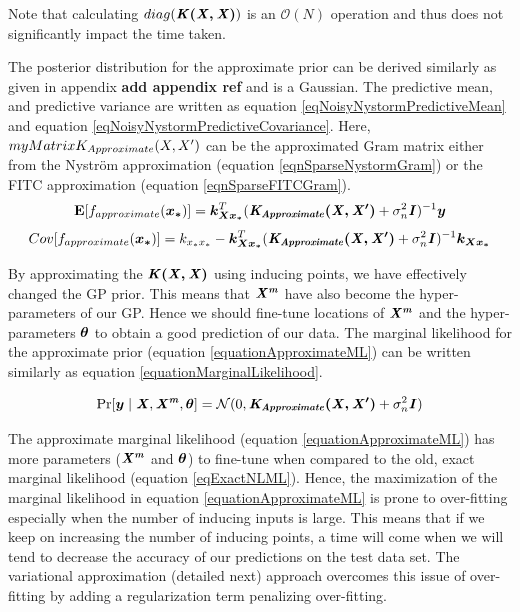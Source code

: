 Note that calculating $diag(\bm{\mathit{K(X, X)}})$ is an $\mathcal{O}\left ( N \right )$ operation and thus does not significantly impact the time taken. 

The posterior distribution for the approximate prior can be derived similarly as given in appendix \textbf{add appendix ref} and is a Gaussian. The predictive mean, and predictive variance are written as equation \ref{eqNoisyNystormPredictiveMean} and equation \ref{eqNoisyNystormPredictiveCovariance}. Here, $\\myMatrix{K_{Approximate}(X, X')}$ can be the approximated Gram matrix either from the Nystr\"{o}m approximation (equation \ref{eqnSparseNystormGram}) or the FITC approximation (equation \ref{eqnSparseFITCGram}). 
\begin{equation}\label{eqNoisyNystormPredictiveMean}
  \mathbf{E}[f_{approximate}(\boldsymbol{x_{*}})] = \boldsymbol{k_{Xx_{*}}}^{T}( \bm{\mathit{K_{Approximate}(X, X')}} + \sigma^{2}_{n}\bm{\mathit{I}})^{-1} \boldsymbol{y}
  \end{equation}
\begin{equation}\label{eqNoisyNystormPredictiveCovariance}
	Cov[f_{approximate}(\boldsymbol{x_{*}})] = k_{x_{*}x_{*}} - \boldsymbol{k_{Xx_{*}}}^{T}( \bm{\mathit{K_{Approximate}(X, X')}} + \sigma^{2}_{n}\bm{\mathit{I}} )^{-1} \boldsymbol{k_{Xx_{*}}}
  \end{equation}


By approximating the $\bm{\mathit{K(X, X)}}$ using inducing points, we have effectively changed the GP prior. This means that $\bm{\mathit{X^{m}}}$ have also become the hyper-parameters of our GP. Hence we should fine-tune locations of $\bm{\mathit{X^{m}}}$ and the hyper-parameters $\boldsymbol{\theta}$ to obtain a good prediction of our data. The marginal likelihood for the approximate prior (equation \ref{equationApproximateML}) can be written similarly as equation \ref{equationMarginalLikelihood}.

\begin{equation}\label{equationApproximateML}
    \Pr[\boldsymbol{y} \mid \bm{\mathit{X}}, \bm{\mathit{X^{m}}}, \boldsymbol{\theta}] = \mathcal{N}(0 , \bm{\mathit{K_{Approximate}(X, X')}} + \sigma^{2}_{n}\bm{\mathit{I}})
\end{equation}

The approximate marginal likelihood (equation \ref{equationApproximateML}) has more parameters ($\bm{\mathit{X^{m}}}$ and $\boldsymbol{\theta}$) to fine-tune when compared to the old, exact marginal likelihood (equation \ref{eqExactNLML}). Hence, the maximization of the marginal likelihood in equation \ref{equationApproximateML} is prone to over-fitting especially when the number of inducing inputs is large. This means that if we keep on increasing the number of inducing points, a time will come when we will tend to decrease the accuracy of our predictions on the test data set. The variational approximation (detailed next) approach overcomes this issue of over-fitting by adding a regularization term penalizing over-fitting.

